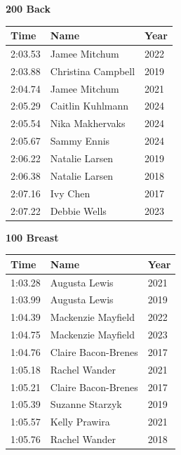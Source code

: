 \vspace{1.2em}
\noindent\begin{minipage}[t]{0.48\textwidth}
\centering
\textbf{\textcolor{teamprimary}{200 Back}}\par
\vspace{0.5em}
\centering
\small
\renewcommand{\arraystretch}{1.0}
\setlength{\tabcolsep}{4pt}
\begin{tabular}{@{}p{1.8cm}p{3.0cm}p{1.0cm}@{}}
\toprule
\textbf{Time} & \textbf{Name} & \textbf{Year} \\
\midrule
2:03.53 & Jamee Mitchum & 2022 \\
2:03.88 & Christina Campbell & 2019 \\
2:04.74 & Jamee Mitchum & 2021 \\
2:05.29 & Caitlin Kuhlmann & 2024 \\
2:05.54 & Nika Makhervaks & 2024 \\
2:05.67 & Sammy Ennis & 2024 \\
2:06.22 & Natalie Larsen & 2019 \\
2:06.38 & Natalie Larsen & 2018 \\
2:07.16 & Ivy Chen & 2017 \\
2:07.22 & Debbie Wells & 2023 \\
\bottomrule
\end{tabular}
\end{minipage}
\hfill
\begin{minipage}[t]{0.48\textwidth}
\centering
\textbf{\textcolor{teamprimary}{100 Breast}}\par
\vspace{0.5em}
\centering
\small
\renewcommand{\arraystretch}{1.0}
\setlength{\tabcolsep}{4pt}
\begin{tabular}{@{}p{1.8cm}p{3.0cm}p{1.0cm}@{}}
\toprule
\textbf{Time} & \textbf{Name} & \textbf{Year} \\
\midrule
1:03.28 & Augusta Lewis & 2021 \\
1:03.99 & Augusta Lewis & 2019 \\
1:04.39 & Mackenzie Mayfield & 2022 \\
1:04.75 & Mackenzie Mayfield & 2023 \\
1:04.76 & Claire Bacon-Brenes & 2017 \\
1:05.18 & Rachel Wander & 2021 \\
1:05.21 & Claire Bacon-Brenes & 2017 \\
1:05.39 & Suzanne Starzyk & 2019 \\
1:05.57 & Kelly Prawira & 2021 \\
1:05.76 & Rachel Wander & 2018 \\
\bottomrule
\end{tabular}
\end{minipage}
